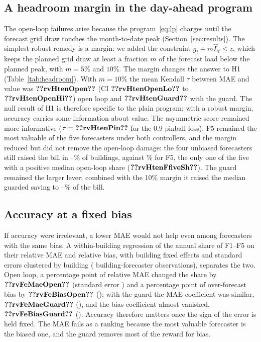 \subsection{A headroom margin in the day-ahead program}\label{sec:explore-headroom}
The open-loop failures arise because the program~\eqref{eq:lp} charges until the forecast grid draw touches the month-to-date peak (Section~\ref{sec:results}). The simplest robust remedy is a margin: we added the constraint $g_t+m\hat L_t\le z$, which keeps the planned grid draw at least a fraction $m$ of the forecast load below the planned peak, with $m=5\%$ and $10\%$. The margin changes the answer to H1 (Table~\ref{tab:headroom}). With $m=10\%$ the mean Kendall $\tau$ between MAE and value was $\res{rvHtenOpen}$ (CI $\res{rvHtenOpenLo}$ to $\res{rvHtenOpenHi}$) open loop and $\res{rvHtenGuard}$ with the guard. The null result of H1 is therefore specific to the plain program; with a robust margin, accuracy carries some information about value. The asymmetric score remained more informative ($\tau=\res{rvHtenPin}$ for the 0.9 pinball loss), F5 remained the most valuable of the five forecasters under both controllers, and the margin reduced but did not remove the open-loop damage: the four unbiased forecasters still raised the bill in --\% of buildings, against \% for F5, the only one of the five with a positive median open-loop share ($\res{rvHtenFfiveSh}$). The guard remained the larger lever; combined with the 10\% margin it raised the median guarded saving to --\% of the bill.

\subsection{Accuracy at a fixed bias}\label{sec:explore-fe}
If accuracy were irrelevant, a lower MAE would not help even among forecasters with the same bias. A within-building regression of the annual share of F1--F5 on their relative MAE and relative bias, with building fixed effects and standard errors clustered by building ( building-forecaster observations), separates the two. Open loop, a percentage point of relative MAE changed the share by $\res{rvFeMaeOpen}$ (standard error ) and a percentage point of over-forecast bias by $\res{rvFeBiasOpen}$ (); with the guard the MAE coefficient was similar, $\res{rvFeMaeGuard}$ (), and the bias coefficient almost vanished, $\res{rvFeBiasGuard}$ (). Accuracy therefore matters once the sign of the error is held fixed. The MAE fails as a ranking because the most valuable forecaster is the biased one, and the guard removes most of the reward for bias.

